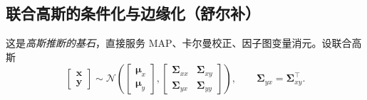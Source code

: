 \subsection{联合高斯的条件化与边缘化（舒尔补）}
\label{sec:est-gauss-cond}

这是\emph{高斯推断的基石}，直接服务 MAP、卡尔曼校正、因子图变量消元。设联合高斯
\begin{equation}
  \begin{bmatrix}\mathbf{x}\\\mathbf{y}\end{bmatrix}\sim
  \mathcal{N}\!\left(\begin{bmatrix}\boldsymbol{\mu}_x\\\boldsymbol{\mu}_y\end{bmatrix},
  \begin{bmatrix}\boldsymbol{\Sigma}_{xx}&\boldsymbol{\Sigma}_{xy}\\\boldsymbol{\Sigma}_{yx}&\boldsymbol{\Sigma}_{yy}\end{bmatrix}\right),
  \qquad \boldsymbol{\Sigma}_{yx}=\boldsymbol{\Sigma}_{xy}^\top.
  \label{eq:joint-gauss}
\end{equation}

